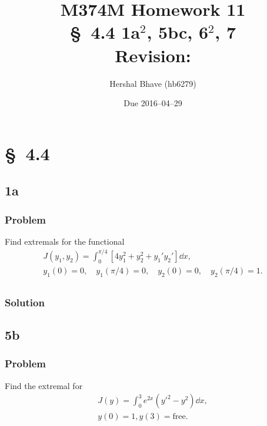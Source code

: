 \documentclass[12pt,twoside]{article}
\title{M374M Homework 11 \\
  \normalsize{\S~4.4 1a$^2$, 5bc, 6$^2$, 7} \\
  Revision: }
\author{Hershal Bhave (hb6279)}
\date{Due 2016--04--29}
\begin{document}
\maketitle

\section{\S~4.4}
\subsection{1a}
\subsubsection*{Problem}
Find extremals for the functional
\begin{equation}
  \label{eq:1a-problem}
  \begin{aligned}
    J(y_1, y_2)=\int_0^{\pi/4}[4y_1^2+y_2^2+y_1'y_2']\dd{x}, \\
    y_1(0)=0, \quad y_1(\pi/4)=0,\quad y_2(0)=0,\quad y_2(\pi/4)=1. \\
  \end{aligned}
\end{equation}

\subsubsection*{Solution}
\todo{}

\subsection{5b}
\subsubsection*{Problem}
Find the extremal for
\begin{equation}
  \label{eq:5a-problem}
  \begin{aligned}
    J(y) = \int_0^3 e^{2x}(y'^2-y^2)\dd{x}, \\
    y(0)=1, y(3)=\text{free}. \\
  \end{aligned}
\end{equation}
\end{document}
